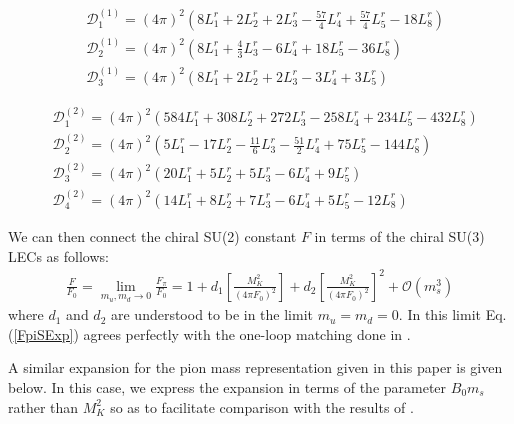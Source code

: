 \documentclass[12pt,a4paper]{article}
\begin{document}
\begin{align}
	& \mathcal{D}_1^{(1)} = (4 \pi )^2 \left( 8 L^r_{1} + 2  L^r_{2} + 2 L^r_{3} - \frac{57}{4} L^r_{4} + \frac{57}{4} L^r_{5} - 18 L^r_{8} \right) \nonumber \\
	& \mathcal{D}_2^{(1)} = (4 \pi )^2 \left( 8 L^r_{1} + \frac{4}{3} L^r_{3} - 6 L^r_{4} + 18 L^r_{5} - 36 L^r_{8} \right) \nonumber \\
	& \mathcal{D}_3^{(1)} = (4 \pi )^2 \left( 8 L^r_{1} + 2 L^r_{2} + 2 L^r_{3} - 3 L^r_{4} + 3 L^r_{5} \right)
\end{align}

\begin{align}
	& \mathcal{D}_1^{(2)} = (4 \pi )^2 \left( 584 L^r_{1} + 308 L^r_{2} + 272 L^r_{3} - 258 L^r_{4} + 234 L^r_{5} - 432 L^r_{8} \right) \nonumber \\
	& \mathcal{D}_2^{(2)} = (4 \pi )^2 \left( 5 L^r_{1} -17 L^r_{2} - \frac{11}{6} L^r_{3} - \frac{51}{2} L^r_{4} + 75 L^r_{5} - 144 L^r_{8} \right) \nonumber \\
	& \mathcal{D}_3^{(2)} = (4 \pi )^2 \left( 20 L^r_{1}+5 L^r_{2}+5 L^r_{3}-6 L^r_{4}+9 L^r_{5} \right) \nonumber \\
	& \mathcal{D}_4^{(2)} = (4 \pi )^2 \left( 14 L^r_{1}+8 L^r_{2}+7 L^r_{3}-6 L^r_{4}+5 L^r_{5}-12 L^r_{8} \right)
\end{align}

We can then connect the chiral SU(2) constant $F$ in terms of the chiral SU(3) LECs as follows:
\begin{align}
	\frac{F}{F_0} = \lim_{m_u,m_d \to 0} \frac{F_{\pi}}{F_0} =  1 + d_1 \left[ \frac{M_K^2}{(4 \pi F_0)^2} \right] + d_2 \left[ \frac{M_K^2}{(4 \pi F_0)^2} \right]^2 + \mathcal{O}(m_s^3)  \label{Fmatching}
\end{align}
where $d_1$ and $d_2$ are understood to be in the limit $m_u=m_d=0$. In this limit Eq.(\ref{FpiSExp}) agrees perfectly with the one-loop matching done in \cite{Gasser:2007sg}.

A similar expansion for the pion mass representation given in this paper is given below. In this case, we express the expansion in terms of the parameter $B_0 m_s$ rather than $M_K^2$ so as to facilitate comparison with the results of \cite{Kaiser:2006uv}.
\end{document}
